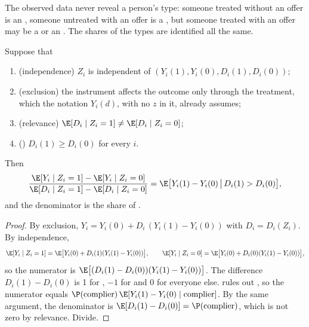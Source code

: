 The observed data never reveal a person's type: someone treated without an
offer is an , someone untreated with an offer is a , but
someone treated with an offer may be a  or an . The
shares of the types are identified all the same.

\begin{theorem}\label{thm:b3:instrumental-variables:late}
Suppose that
\begin{enumerate}
\item (independence) $Z_i$ is independent of $(Y_i(1), Y_i(0), D_i(1), D_i(0))$;
\item (exclusion) the instrument affects the outcome only through the
treatment, which the notation $Y_i(d)$, with no $z$ in it, already assumes;
\item (relevance) $\E[D_i \mid Z_i = 1] \neq \E[D_i \mid Z_i = 0]$;
\item () $D_i(1) \geq D_i(0)$ for every $i$.
\end{enumerate}
Then
\[
  \frac{\E[Y_i \mid Z_i = 1] - \E[Y_i \mid Z_i = 0]}{\E[D_i \mid Z_i = 1] - \E[D_i \mid Z_i = 0]}
  = \E\bigl[Y_i(1) - Y_i(0) \,\big|\, D_i(1) > D_i(0)\bigr],
\]
and the denominator is the share of .
\end{theorem}

\begin{proof}
By exclusion, $Y_i = Y_i(0) + D_i\,(Y_i(1) - Y_i(0))$ with $D_i = D_i(Z_i)$. By
independence,
\[
  \E[Y_i \mid Z_i = 1] = \E\bigl[Y_i(0) + D_i(1)(Y_i(1) - Y_i(0))\bigr],
  \qquad
  \E[Y_i \mid Z_i = 0] = \E\bigl[Y_i(0) + D_i(0)(Y_i(1) - Y_i(0))\bigr],
\]
so the numerator is $\E\bigl[(D_i(1) - D_i(0))(Y_i(1) - Y_i(0))\bigr]$. The
difference $D_i(1) - D_i(0)$ is 1 for , $-1$ for  and 0 for
everyone else.  rules out , so the numerator equals
$\P(\text{complier})\,\E[Y_i(1) - Y_i(0) \mid \text{complier}]$. By the same
argument, the denominator is $\E[D_i(1) - D_i(0)] = \P(\text{complier})$, which
is not zero by relevance. Divide.
\end{proof}

